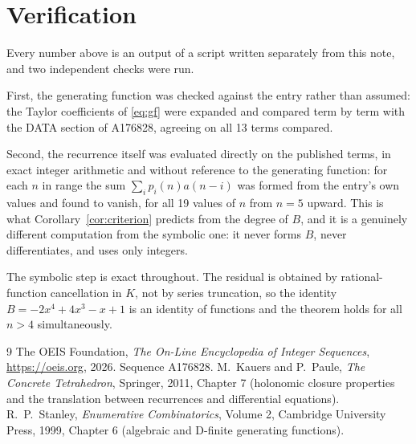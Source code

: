 \documentclass[11pt,a4paper]{article}
\theoremstyle{plain}
\theoremstyle{definition}
\begin{document}
\section{Verification}

Every number above is an output of a script written separately from this note, and two
independent checks were run.

First, the generating function was checked against the entry rather than assumed: the
Taylor coefficients of \eqref{eq:gf} were expanded and compared term by term with the DATA
section of A176828, agreeing on all 13 terms compared.

Second, the recurrence itself was evaluated directly on the published terms, in exact
integer arithmetic and without reference to the generating function: for each $n$ in range
the sum $\sum_{i}p_{i}(n)a(n-i)$ was formed from the entry's own values and found to
vanish, for all 19 values of $n$ from $n=5$ upward. This is what
Corollary~\ref{cor:criterion} predicts from the degree of $B$, and it is a genuinely
different computation from the symbolic one: it never forms $B$, never differentiates, and
uses only integers.

The symbolic step is exact throughout. The residual is obtained by rational-function
cancellation in $K$, not by series truncation, so the identity $B=- 2 x^{4} + 4 x^{3} - x + 1$ is an
identity of functions and the theorem holds for all $n>4$ simultaneously.

\begin{thebibliography}{9}
 The OEIS Foundation, \emph{The On-Line Encyclopedia of Integer Sequences},
\url{https://oeis.org}, 2026. Sequence A176828.
 M.~Kauers and P.~Paule, \emph{The Concrete Tetrahedron}, Springer, 2011,
Chapter 7 (holonomic closure properties and the translation between recurrences and
differential equations).
 R.~P.~Stanley, \emph{Enumerative Combinatorics}, Volume 2, Cambridge
University Press, 1999, Chapter 6 (algebraic and D-finite generating functions).
\end{thebibliography}
\end{document}
